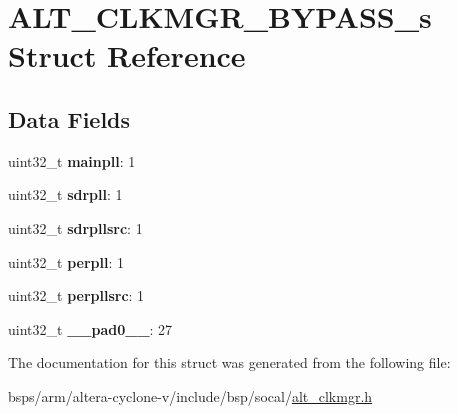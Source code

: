 \hypertarget{structALT__CLKMGR__BYPASS__s}{}\section{A\+L\+T\+\_\+\+C\+L\+K\+M\+G\+R\+\_\+\+B\+Y\+P\+A\+S\+S\+\_\+s Struct Reference}
\label{structALT__CLKMGR__BYPASS__s}
\subsection*{Data Fields}
\begin{DoxyCompactItemize}
\item 
\mbox{\label{structALT__CLKMGR__BYPASS__s_a19c194e87bf83838d39b51a3f6bb6257}} 
uint32\+\_\+t {\bfseries mainpll}\+: 1
\item 
\mbox{\label{structALT__CLKMGR__BYPASS__s_a469e4d6c82c18c84082aebf847df0fd3}} 
uint32\+\_\+t {\bfseries sdrpll}\+: 1
\item 
\mbox{\label{structALT__CLKMGR__BYPASS__s_aa32489ecf0220745260f7d8aa1fe01b6}} 
uint32\+\_\+t {\bfseries sdrpllsrc}\+: 1
\item 
\mbox{\label{structALT__CLKMGR__BYPASS__s_a826fd428f69b60f0b223a3dd4abf36cf}} 
uint32\+\_\+t {\bfseries perpll}\+: 1
\item 
\mbox{\label{structALT__CLKMGR__BYPASS__s_a9ee2a6d21c3e6125e597fe217c262a36}} 
uint32\+\_\+t {\bfseries perpllsrc}\+: 1
\item 
\mbox{\label{structALT__CLKMGR__BYPASS__s_ab28d3acba23ead39851540799fa8615d}} 
uint32\+\_\+t {\bfseries \+\_\+\+\_\+pad0\+\_\+\+\_\+}\+: 27
\end{DoxyCompactItemize}


The documentation for this struct was generated from the following file\+:\begin{DoxyCompactItemize}
\item 
bsps/arm/altera-\/cyclone-\/v/include/bsp/socal/\mbox{\hyperlink{alt__clkmgr_8h}{alt\+\_\+clkmgr.\+h}}\end{DoxyCompactItemize}
